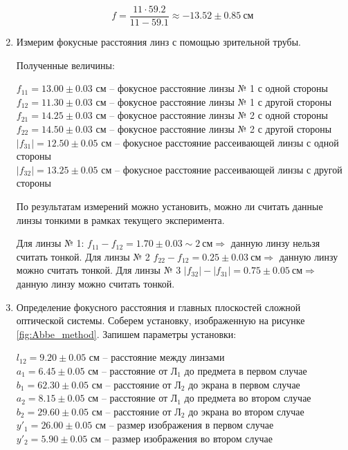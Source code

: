 \begin{enumerate}
		\[ f = \frac{11 \cdot 59.2}{11 - 59.1} \approx -13.52 \pm 0.85 ~ \text{см} \]
		
		\item Измерим фокусные расстояния линз с помощью зрительной трубы.
		
		Полученные величины:
		
		\begin{center}
			$f_{11} = 13.00 \pm 0.03$ см -- фокусное расстояние линзы № 1 с одной стороны \\
			$f_{12} = 11.30 \pm 0.03$ см -- фокусное расстояние линзы № 1 с другой стороны \\
			$f_{21} = 14.25 \pm 0.03$ см -- фокусное расстояние линзы № 2 с одной стороны \\ 
			$f_{22} = 14.50 \pm 0.03$ см -- фокусное расстояние линзы № 2 с другой стороны \\
			$|f_{31}| = 12.50 \pm 0.05$ см -- фокусное расстояние рассеивающей линзы с одной стороны \\
			$|f_{32}| = 13.25 \pm 0.05$ см -- фокусное расстояние рассеивающей линзы с другой стороны \\
		\end{center}
	
		По результатам измерений можно установить, можно ли считать данные линзы тонкими в рамках текущего эксперимента.
		
		Для линзы № 1: $f_{11} - f_{12} = 1.70 \pm 0.03 \sim 2 ~ \text{см} \Rightarrow$ данную линзу нельзя считать тонкой. Для линзы № 2 $f_{22} - f_{12} = 0.25 \pm 0.03 ~ \text{см} \Rightarrow$ данную линзу можно считать тонкой. Для линзы № 3 $|f_{32}| - |f_{31}| = 0.75 \pm 0.05 ~ \text{см} \Rightarrow$ данную линзу можно считать тонкой.
		
		\item Определение фокусного расстояния и главных плоскостей сложной оптической системы. Соберем установку, изображенную на рисунке \ref{fig:Abbe_method}. Запишем параметры установки:
		
		\begin{center}
			$l_{12} = 9.20 \pm 0.05$ см -- расстояние между линзами \\
			$a_1 = 6.45 \pm 0.05$ см -- расстояние от Л$_1$ до предмета в первом случае \\
			$b_1 = 62.30 \pm 0.05$ см -- расстояние от Л$_2$ до экрана в первом случае \\
			$a_2 = 8.15 \pm 0.05$ см -- расстояние от Л$_1$ до предмета во втором случае \\
			$b_2 = 29.60 \pm 0.05$ см -- расстояние от Л$_2$ до экрана во втором случае \\
			$y'_1 = 26.00 \pm 0.05$ см -- размер изображения в первом случае \\
			$y'_2 = 5.90 \pm 0.05$ см -- размер изображения во втором случае \\
		\end{center}
	

\end{enumerate}
